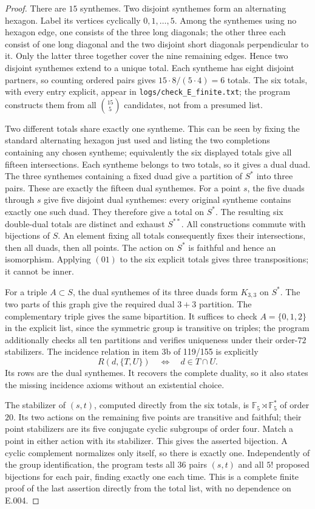 \begin{proof}
There are $15$ synthemes. Two disjoint synthemes form an alternating
hexagon. Label its vertices cyclically $0,1,\ldots,5$. Among the synthemes
using no hexagon edge, one consists of the three long diagonals; the
other three each consist of one long diagonal and the two disjoint short
diagonals perpendicular to it. Only the latter three together cover the
nine remaining edges. Hence two disjoint synthemes extend to a unique
total. Each syntheme has eight disjoint partners, so counting ordered
pairs gives $15\cdot8/(5\cdot4)=6$ totals. The six totals, with every
entry explicit, appear in \texttt{logs/check\_E\_finite.txt}; the program
constructs them from all $\binom{15}{5}$ candidates, not from a presumed
list.

Two different totals share exactly one syntheme. This can be seen by
fixing the standard alternating hexagon just used and listing the two
completions containing any chosen syntheme; equivalently the six displayed
totals give all fifteen intersections. Each syntheme belongs to two
totals, so it gives a dual duad. The three synthemes containing a fixed
duad give a partition of $S^*$ into three pairs. These are exactly the
fifteen dual synthemes. For a point $s$, the five duads through $s$ give
five disjoint dual synthemes: every original syntheme contains exactly
one such duad. They therefore give a total on $S^*$. The resulting six
double-dual totals are distinct and exhaust $S^{**}$. All constructions
commute with bijections of $S$. An element fixing all totals consequently
fixes their intersections, then all duads, then all points. The action
on $S^*$ is faithful and hence an isomorphism. Applying $(01)$ to the
six explicit totals gives three transpositions; it cannot be inner.

For a triple $A\subset S$, the dual synthemes of its three duads form
$K_{3,3}$ on $S^*$. The two parts of this graph give the required dual
$3+3$ partition. The complementary triple gives the same bipartition.
It suffices to check $A=\{0,1,2\}$ in the explicit list, since the
symmetric group is transitive on triples; the program additionally checks
all ten partitions and verifies uniqueness under their order-$72$
stabilizers. The incidence relation in item 3b of 119/155 is explicitly
\[
 R(d,\{T,U\})\quad\Longleftrightarrow\quad d\in T\cap U.
\]
Its rows are the dual synthemes. It recovers the complete duality, so it
also states the missing incidence axioms without an existential choice.

The stabilizer of $(s,t)$, computed directly from the six totals, is
$\mathbb F_5\rtimes\mathbb F_5^*$ of order $20$. Its two actions on the
remaining five points are transitive and faithful; their point stabilizers
are its five conjugate cyclic subgroups of order four. Match a point in
either action with its stabilizer. This gives the asserted bijection.
A cyclic complement normalizes only itself, so there is exactly one.
Independently of the group identification, the program tests all $36$
pairs $(s,t)$ and all $5!$ proposed bijections for each pair, finding
exactly one each time. This is a complete finite proof of the last
assertion directly from the total list, with no dependence on E.004.


\end{proof}
